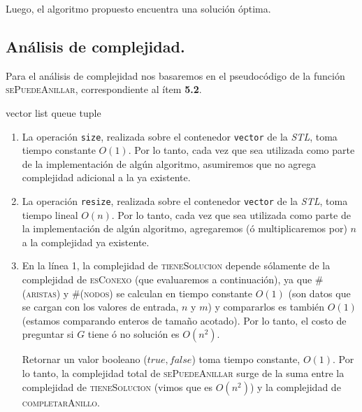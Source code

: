 Luego, el algoritmo propuesto encuentra una solución óptima.


\newpage
\subsection{Análisis de complejidad.}

\vspace*{0.3cm}

Para el análisis de complejidad nos basaremos en el pseudocódigo de la función
\textsc{sePuedeAnillar}, correspondiente al ítem \textbf{5.2}.

vector
list
queue
tuple

\begin{enumerate}
  \item La operación \verb|size|, realizada sobre el contenedor \verb|vector| de la
  \textit{STL}, toma tiempo constante $O(1)$. Por lo tanto, cada vez que sea utilizada
  como parte de la implementación de algún algoritmo, asumiremos que no agrega complejidad
  adicional a la ya existente.

  \item La operación \verb|resize|, realizada sobre el contenedor \verb|vector| de la
  \textit{STL}, toma tiempo lineal $O(n)$. Por lo tanto, cada vez que sea utilizada
  como parte de la implementación de algún algoritmo, agregaremos (ó multiplicaremos por)
  $n$ a la complejidad ya existente.

  \item En la línea 1, la complejidad de \textsc{tieneSolucion} depende sólamente de
  la complejidad de \textsc{esConexo} (que evaluaremos a continuación), ya que
  \textsc{\#(aristas)} y \textsc{\#(nodos)} se calculan en tiempo constante $O(1)$
  (son datos que se cargan con los valores de entrada, $n$ y $m$) y compararlos es
  también $O(1)$ (estamos comparando enteros de tamaño acotado).
  Por lo tanto, el costo de preguntar si $G$ tiene ó no solución es $O(n^2)$.

  Retornar un valor booleano ($true, false$) toma tiempo constante, $O(1)$. Por lo tanto,
  la complejidad total de \textsc{sePuedeAnillar} surge de la suma entre la complejidad de
  \textsc{tieneSolucion} (vimos que es $O(n^2)$) y la complejidad de \textsc{completarAnillo}.


\end{enumerate}
